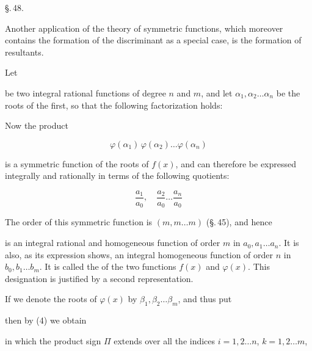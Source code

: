 
\begin{center}
\S.\,48.

\end{center}

Another application of the theory of symmetric functions, which moreover contains the formation of the discriminant as a special case, is the formation of resultants.

Let



be two integral rational functions of degree $n$ and $m$, and let $\alpha_1, \alpha_2 \ldots \alpha_n$ be the roots of the first, so that the following factorization holds:


Now the product

\[
\varphi(\alpha_1)\,\varphi(\alpha_2) \ldots \varphi(\alpha_n)
\]

is a symmetric function of the roots of $f(x)$, and can therefore be expressed integrally and rationally in terms of the following quotients:

\[
\frac{a_1}{a_0}, \quad \frac{a_2}{a_0} \ldots \frac{a_n}{a_0}
\]

The order of this symmetric function is $(m, m \ldots m)$ (\S.\,45), and hence


is an integral rational and homogeneous function of order $m$ in $a_0, a_1 \ldots a_n$. It is also, as its expression shows, an integral homogeneous function of order $n$ in $b_0, b_1 \ldots b_m$. It is called the  of the two functions $f(x)$ and $\varphi(x)$. This designation is justified by a second representation.

If we denote the roots of $\varphi(x)$ by $\beta_1, \beta_2 \ldots \beta_m$, and thus put


then by (4) we obtain


in which the product sign $\Pi$ extends over all the indices $i = 1, 2 \ldots n$, $k = 1, 2 \ldots m$,
